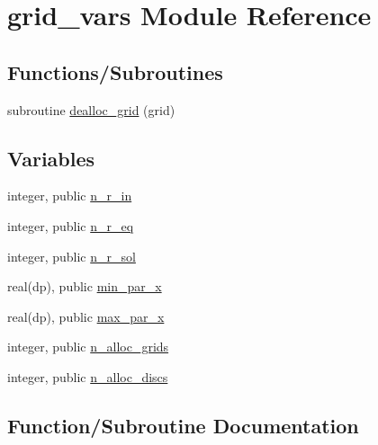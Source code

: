 \hypertarget{namespacegrid__vars}{}\section{grid\+\_\+vars Module Reference}
\label{namespacegrid__vars}
\subsection*{Functions/\+Subroutines}
\begin{DoxyCompactItemize}
\item 
subroutine \hyperlink{namespacegrid__vars_abc8ea59261a1e773754afebdb13276f9}{dealloc\+\_\+grid} (grid)
\end{DoxyCompactItemize}
\subsection*{Variables}
\begin{DoxyCompactItemize}
\item 
integer, public \hyperlink{namespacegrid__vars_ad1047cc6f07720d61c8e6fdc3c68a317}{n\+\_\+r\+\_\+in}
\item 
integer, public \hyperlink{namespacegrid__vars_aa3785d71892d3d7db81aca0b6aa880b0}{n\+\_\+r\+\_\+eq}
\item 
integer, public \hyperlink{namespacegrid__vars_ad998db12a656afb94d2d54a7d0eca642}{n\+\_\+r\+\_\+sol}
\item 
real(dp), public \hyperlink{namespacegrid__vars_a689c08cf03bc54338878f85c6429b856}{min\+\_\+par\+\_\+x}
\item 
real(dp), public \hyperlink{namespacegrid__vars_acaa1fd21d0c728ad8f24591c0d2a5801}{max\+\_\+par\+\_\+x}
\item 
integer, public \hyperlink{namespacegrid__vars_ac4b43443d16af06fdc62d542b3eadee2}{n\+\_\+alloc\+\_\+grids}
\item 
integer, public \hyperlink{namespacegrid__vars_a23b5e4789dc5d3d0d6dadeb47909ddbd}{n\+\_\+alloc\+\_\+discs}
\end{DoxyCompactItemize}


\subsection{Function/\+Subroutine Documentation}
\mbox{\label{namespacegrid__vars_abc8ea59261a1e773754afebdb13276f9}} 
